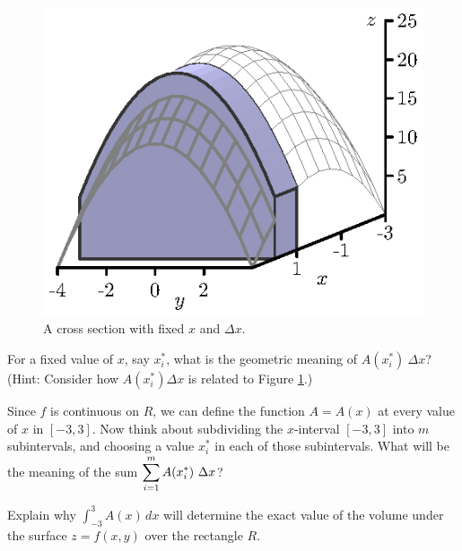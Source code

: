 \begin{pa}
\begin{figure}[ht]
\begin{center}
\begin{minipage}{2.5in}
\begin{center}
  \includegraphics{figures/fig_11_2_preview_thick.eps}
\end{center}
\caption{A cross section with fixed $x$ and $\Delta x$.}
\label{F:11.2.Cross_section_PA_y_slab}
\end{minipage}
\end{center}
\end{figure}



  	\item For a fixed value of $x$, say $x_i^*$, what is the geometric meaning of $A(x_i^*) \ \Delta x$?  (Hint: Consider how $A(x_i^*) \Delta x$ is related to Figure \ref{F:11.2.Cross_section_PA_y_slab}.)


	\item Since $f$ is continuous on $R$, we can define the function $A = A(x)$ at every value of $x$ in $[-3,3]$. Now think about subdividing the $x$-interval $[-3,3]$ into $m$ subintervals, and choosing a value $x_i^*$ in each of those subintervals.  What will be the meaning of the sum $\displaystyle \sum_{i=1}^m A(x_i^*) \ \Delta x$? 


	\item Explain why $\int_{-3}^3 A(x) \, dx$ will determine the exact value of the volume under the surface $z = f(x,y)$ over the rectangle $R$.


	\ea
\end{pa} 


